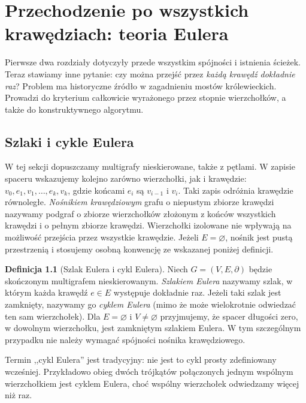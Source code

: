 \documentclass[11pt,a4paper]{report}
\numberwithin{equation}{section}
\theoremstyle{plain}
\theoremstyle{definition}
\newtheorem{definicja}[twierdzenie]{Definicja}
\theoremstyle{remark}
\begin{document}

\chapter{Przechodzenie po wszystkich krawędziach: teoria Eulera}
\label{ch:tg-euler}

Pierwsze dwa rozdziały dotyczyły przede wszystkim spójności i istnienia
ścieżek. Teraz stawiamy inne pytanie: czy można przejść przez \emph{każdą
krawędź dokładnie raz}? Problem ma historyczne źródło w zagadnieniu
mostów królewieckich. Prowadzi do kryterium całkowicie wyrażonego
przez stopnie wierzchołków, a także do konstruktywnego algorytmu.

\section{Szlaki i cykle Eulera}
\label{sec:tg-euler-def}

W tej sekcji dopuszczamy multigrafy nieskierowane, także z pętlami.
W zapisie spaceru wskazujemy kolejno zarówno wierzchołki, jak i
krawędzie: $v_0,e_1,v_1,\ldots,e_k,v_k$, gdzie końcami $e_i$ są
$v_{i-1}$ i $v_i$. Taki zapis odróżnia krawędzie równoległe.
\emph{Nośnikiem krawędziowym} grafu o niepustym zbiorze
krawędzi nazywamy podgraf o zbiorze wierzchołków złożonym
z końców wszystkich krawędzi i o pełnym zbiorze krawędzi.
Wierzchołki izolowane nie wpływają na możliwość przejścia
przez wszystkie krawędzie. Jeżeli $E=\varnothing$, nośnik
jest pustą przestrzenią i stosujemy osobną konwencję
ze wskazanej poniżej definicji.

\begin{definicja}[Szlak Eulera i cykl Eulera]
Niech $G=(V,E,\partial)$ będzie skończonym multigrafem nieskierowanym.
\emph{Szlakiem Eulera} nazywamy szlak, w którym każda krawędź
$e\in E$ występuje dokładnie raz. Jeżeli taki szlak jest zamknięty,
nazywamy go \emph{cyklem Eulera} (mimo że może wielokrotnie
odwiedzać ten sam wierzchołek). Dla $E=\varnothing$ i $V\ne\varnothing$ przyjmujemy,
że spacer długości zero, w dowolnym wierzchołku,
jest zamkniętym szlakiem Eulera. W tym szczególnym przypadku
nie należy wymagać spójności nośnika krawędziowego.
\end{definicja}

Termin ,,cykl Eulera'' jest tradycyjny: nie jest to cykl prosty
zdefiniowany wcześniej. Przykładowo obieg dwóch trójkątów
połączonych jednym wspólnym wierzchołkiem jest cyklem Eulera,
choć wspólny wierzchołek odwiedzamy więcej niż raz.
\end{document}
